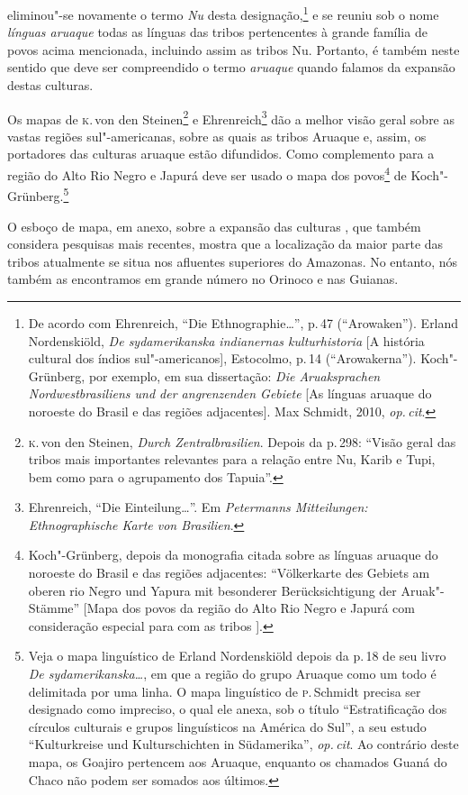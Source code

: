 eliminou"-se novamente o termo \textit{Nu} desta designação,\footnote{De acordo
  com Ehrenreich, ``Die Ethnographie\ldots'', p.\,47 (``Arowaken''). Erland Nordenskiöld,
  \textit{De sydamerikanska indianernas kulturhistoria} {[}A história
  cultural dos índios sul"-americanos{]}, Estocolmo, p.\,14
  (``Arowakerna''). Koch"-Grünberg, por exemplo, em sua dissertação:
  \textit{Die Aruaksprachen Nordwestbrasiliens und der angrenzenden
  Gebiete} {[}As línguas aruaque do noroeste do Brasil e das regiões
  adjacentes{]}. Max Schmidt, 2010, \textit{op.\,cit}.} e se
reuniu sob o nome \textit{línguas aruaque} todas as línguas das tribos
pertencentes à grande família de povos acima mencionada, incluindo assim
as tribos Nu. Portanto, é também neste sentido que deve ser compreendido o
termo \textit{aruaque} quando falamos da expansão destas culturas.

Os mapas de \textsc{k}.\,von den Steinen\footnote{\textsc{k}.\,von den Steinen, \textit{Durch
  Zentralbrasilien}. Depois da p.\,298: ``Visão geral das
  tribos mais importantes relevantes para a relação entre Nu, Karib e
  Tupi, bem como para o agrupamento dos Tapuia''.} e
Ehrenreich\footnote{Ehrenreich, ``Die Einteilung\ldots''. Em \textit{Petermanns Mitteilungen: Ethnographische Karte von Brasilien}.}
dão a melhor visão geral sobre as vastas regiões sul"-americanas, sobre
as quais as tribos Aruaque e, assim, os portadores das culturas aruaque
estão difundidos. Como complemento para a região do Alto Rio Negro e
Japurá deve ser usado o mapa dos povos\footnote{Koch"-Grünberg, depois da
  monografia citada sobre as línguas aruaque do noroeste do Brasil e das
  regiões adjacentes: ``Völkerkarte des Gebiets am oberen rio Negro und
  Yapura mit besonderer Berücksichtigung der Aruak"-Stämme'' {[}Mapa dos
  povos da região do Alto Rio Negro e Japurá com consideração especial
  para com as tribos {]}.} de Koch"-Grünberg.\footnote{Veja o mapa
  linguístico de Erland Nordenskiöld depois da p.\,18 de seu livro
  \textit{De sydamerikanska\ldots}, em que a região
  do grupo Aruaque como um todo é delimitada por uma linha.
  O mapa linguístico de \textsc{p}.\,Schmidt precisa ser designado como impreciso,
  o qual ele anexa, sob o título ``Estratificação dos círculos
  culturais e grupos linguísticos na América do Sul'', a seu estudo
  ``Kulturkreise und Kulturschichten in Südamerika'', \textit{op.\,cit}. Ao
  contrário deste mapa, os Goajiro pertencem aos Aruaque, enquanto os
  chamados Guaná do Chaco não podem ser somados aos últimos.}

O esboço de mapa, em anexo, sobre a expansão das culturas , que
também considera pesquisas mais recentes, mostra que a localização da
maior parte das tribos atualmente se situa nos afluentes
superiores do Amazonas. No entanto, nós também as encontramos em grande
número no Orinoco e nas Guianas. 

